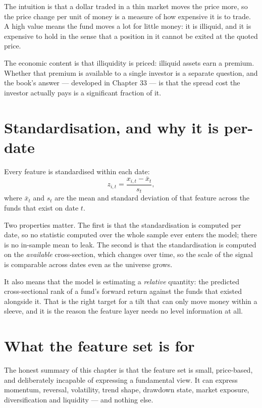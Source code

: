 The intuition is that a dollar traded in a thin market moves the price
more, so the price change per unit of money is a measure of how expensive
it is to trade. A high value means the fund moves a lot for little money:
it is illiquid, and it is expensive to hold in the sense that a position
in it cannot be exited at the quoted price.

The economic content is that illiquidity is priced: illiquid assets earn
a premium. Whether that premium is available to a single investor is a
separate question, and the book's answer --- developed in Chapter 33 ---
is that the spread cost the investor actually pays is a significant
fraction of it.

\section{Standardisation, and why it is per-date}

Every feature is standardised within each date:
\[
z_{i,t} = \frac{x_{i,t} - \bar{x}_t}{s_t},
\]
where \(\bar{x}_t\) and \(s_t\) are the mean and standard deviation of
that feature across the funds that exist on date \(t\).

Two properties matter. The first is that the standardisation is computed
per date, so no statistic computed over the whole sample ever enters the
model; there is no in-sample mean to leak. The second is that the
standardisation is computed on the \emph{available} cross-section, which
changes over time, so the scale of the signal is comparable across dates
even as the universe grows.

It also means that the model is estimating a \emph{relative} quantity: the
predicted cross-sectional rank of a fund's forward return against the funds
that existed alongside it. That is the right target for a tilt that can
only move money within a sleeve, and it is the reason the feature layer
needs no level information at all.

\section{What the feature set is for}

The honest summary of this chapter is that the feature set is small,
price-based, and deliberately incapable of expressing a fundamental view.
It can express momentum, reversal, volatility, trend shape, drawdown
state, market exposure, diversification and liquidity --- and nothing else.

